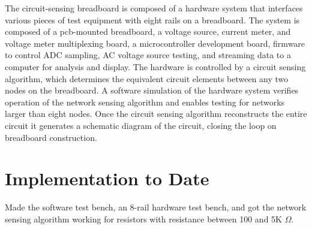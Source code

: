 The circuit-sensing breadboard is composed of a hardware system that interfaces various pieces of test equipment with eight rails on a breadboard.
The system is composed of a pcb-mounted breadboard, a voltage source, current meter, and voltage meter multiplexing board, a microcontroller development board, firmware to control ADC sampling, AC voltage source testing, and streaming data to a computer for analysis and display.
The hardware is controlled by a circuit sensing algorithm, which determines the equivalent circuit elements between any two nodes on the breadboard.
A software simulation of the hardware system verifies operation of the network sensing algorithm and enables testing for networks larger than eight nodes.
Once the circuit sensing algorithm reconstructs the entire circuit it generates a schematic diagram of the circuit, closing the loop on breadboard construction.



\section{Implementation to Date}


Made the software test bench, an 8-rail hardware test bench, and got the network sensing algorithm working for resistors with resistance between 100 and 5K $\Omega$.




